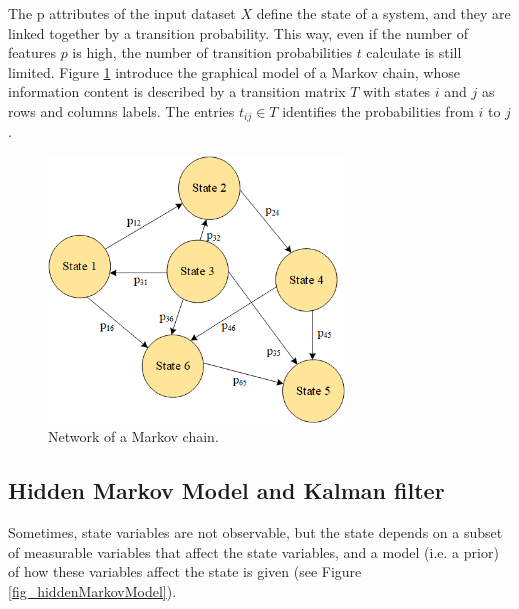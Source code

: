 The p attributes of the input dataset $X$ define the state of a system, and they are linked together by a transition probability. This way, even if the number of features $p$ is high, the number of transition probabilities $t$ calculate is still limited. Figure \ref{fig_markovChain} introduce the graphical model of a Markov chain, whose information content is described by a transition matrix $T$ with states $i$ and $j$ as rows and columns labels. The entries $t_{ij}\in T$ identifies the probabilities from $i$ to $j$.

\begin{figure}[hbt!]
\centering
\includegraphics[width=0.7\textwidth]{SectionLetsMath/nonLinearMethods_fig/fig_markovChain.png}
\captionsetup{type=figure}
\caption{Network of a Markov chain.}
\label{fig_markovChain}
\end{figure}

\subsection{Hidden Markov Model and Kalman filter} \label{secKalmanFilter}
Sometimes, state variables are not observable, but the state depends on a subset of measurable variables that affect the state variables, and a model (i.e. a prior) of how these variables affect the state is given (see Figure \ref{fig_hiddenMarkovModel}).


